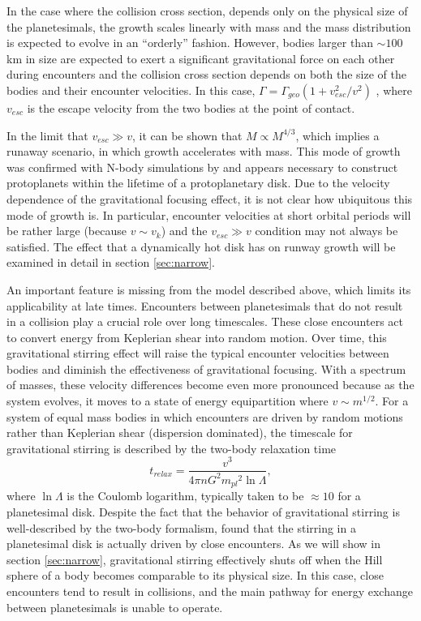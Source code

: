 \documentclass[twocolumn]{aastex63}
\begin{document}
In the case where the collision cross section, depends only
on the physical size of the planetesimals, the growth scales linearly
with mass and the mass distribution is expected to evolve in an
``orderly'' fashion. However, bodies larger than $\sim 100$ km in size are expected to exert a significant gravitational force on each other during encounters and the collision cross section depends on both the size of the bodies and their encounter velocities. In this case, $\Gamma = \Gamma_{geo} \left( 1 + v_{esc}^2 / v^2 \right)$ \citep{safronov69}, where $v_{esc}$ is the escape velocity from the two bodies at the point of contact.

In the limit that $v_{esc} \gg v$, it can be shown that $M \propto
M^{4/3}$, which implies a runaway scenario, in which growth
accelerates with mass. This mode of growth was confirmed with N-body
simulations by \citet{kokubo96} and appears necessary to construct
protoplanets within the lifetime of a protoplanetary disk. Due to the
velocity dependence of the gravitational focusing effect, it is not clear how ubiquitous this mode of growth is. In particular, encounter velocities at short orbital periods will be rather large (because $v \sim v_{k}$) and the $v_{esc} \gg v$ condition may not always be satisfied. The effect that a dynamically hot disk has on runway growth will be examined in detail in section \ref{sec:narrow}.

An important feature is missing from the model described above, which
limits its applicability at late times. Encounters between
planetesimals that do not result in a collision play a crucial role
over long timescales. These close encounters act to convert energy
from Keplerian shear into random motion. Over time, this gravitational
stirring effect will raise the typical encounter velocities between
bodies and diminish the effectiveness of gravitational focusing. With
a spectrum of masses, these velocity differences become even more
pronounced because as the system evolves, it moves to a state of
energy equipartition where $v \sim m^{1/2}$. For a system of equal mass bodies in which encounters are driven by random motions rather than Keplerian shear (dispersion dominated), the timescale for gravitational stirring is described by the two-body relaxation time \citep{ida93}
\begin{equation}\label{eq:relax}
	t_{relax} = \frac{v^3}{4 \pi n G^2 {m_{pl}}^2 \ln \Lambda},
\end{equation}
where $\ln \Lambda$ is the Coulomb logarithm,
typically taken to be $\approx 10$ for a planetesimal disk. Despite
the fact that the behavior of gravitational stirring is well-described
by the two-body formalism, \citep{ida93} found that the stirring in a planetesimal disk is actually driven by close encounters. As we will show in section \ref{sec:narrow}, gravitational stirring effectively shuts off when the Hill sphere of a body becomes comparable to its physical size. In this case, close encounters tend to result in collisions, and the main pathway for energy exchange between planetesimals is unable to operate.
\end{document}
